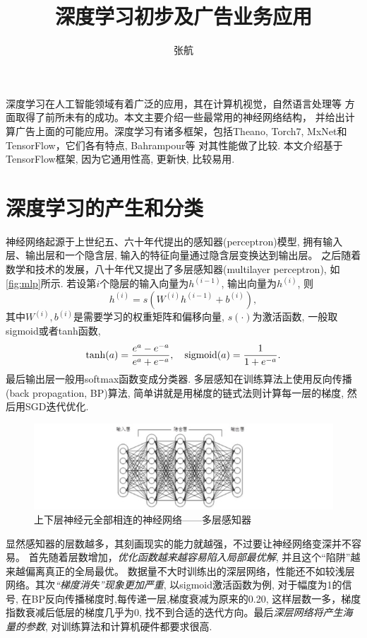 \documentclass{ctexart}
\title{深度学习初步及广告业务应用}
\author{张航}
\begin{document}

\maketitle
深度学习在人工智能领域有着广泛的应用，其在计算机视觉，自然语言处理等
方面取得了前所未有的成功。本文主要介绍一些最常用的神经网络结构，
并给出计算广告上面的可能应用。深度学习有诸多框架，包括Theano, Torch7,
MxNet和TensorFlow，它们各有特点, Bahrampour等\cite{bahrampour2015comparative}
对其性能做了比较. 本文介绍基于TensorFlow框架, 因为它通用性高, 更新快, 比较易用.

\section{深度学习的产生和分类}
神经网络起源于上世纪五、六十年代提出的感知器(perceptron)模型,
拥有输入层、输出层和一个隐含层, 输入的特征向量通过隐含层变换达到输出层。
之后随着数学和技术的发展，八十年代又提出了多层感知器(multilayer perceptron),
如\autoref{fig:mlp}所示. 若设第\(i\)个隐层的输入向量为\(h^{(i-1)}\),
输出向量为\(h^{(i)}\), 则
\[
  h^{(i)} = s(W^{(i)}h^{(i-1)}+b^{(i)}),
\]
其中\(W^{(i)},b^{(i)}\)是需要学习的权重矩阵和偏移向量, \(s(\cdot)\)为激活函数, 一般取sigmoid或者tanh函数,
\[
  \tanh(a)=\frac{e^a-e^{-a}}{e^a+e^{-a}},\quad \operatorname*{sigmoid}(a)=\frac{1}{1+e^{-a}}.
\]
最后输出层一般用softmax函数变成分类器. 
多层感知在训练算法上使用反向传播(back propagation, BP)算法,
简单讲就是用梯度的链式法则计算每一层的梯度, 然后用SGD迭代优化.
\begin{figure}[htb]
  \centering
  \includegraphics[width=\textwidth]{mlp}
  \caption{上下层神经元全部相连的神经网络——多层感知器}
  \label{fig:mlp}
\end{figure}

显然感知器的层数越多，其刻画现实的能力就越强，不过要让神经网络变深并不容易。
首先随着层数增加，\emph{优化函数越来越容易陷入局部最优解}, 并且这个“陷阱”越来越偏离真正的全局最优。
数据量不大时训练出的深层网络，性能还不如较浅层网络。其次\emph{“梯度消失”现象更加严重},
以sigmoid激活函数为例, 对于幅度为1的信号, 在BP反向传播梯度时,每传递一层,梯度衰减为原来的0.20,
这样层数一多，梯度指数衰减后低层的梯度几乎为0,
找不到合适的迭代方向。最后\emph{深层网络将产生海量的参数},
对训练算法和计算机硬件都要求很高.
\end{document}
